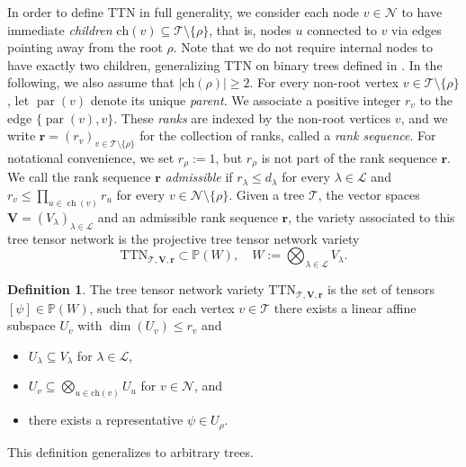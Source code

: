 \documentclass[12pt]{article}
\theoremstyle{definition}
\newtheorem{definition}[theorem]{Definition}
\numberwithin{theorem}{section}
\newcommand{\PP}{\mathbb{P}}
\begin{document}
In order to define TTN in full generality, we consider each node $v \in \mathscr N$ to have immediate \emph{children} $\mathrm{ch}(v) \subseteq \mathscr T\setminus \{\rho\}$, that is, nodes $u$ connected to $v$ via edges pointing away from the root $\rho$.  Note that we do not require internal nodes to have exactly two children,  generalizing TTN on binary trees defined in \cite{BUCZYNSKA_2015}. 
In the following, we also assume that $|\mathrm{ch}(\rho)| \geq 2$. For every non-root vertex
$v\in\mathscr T\setminus\{\rho\}$, let
$\operatorname{par}(v)$ denote its unique \emph{parent}. We associate a
positive integer $r_v$ to the edge $\{\operatorname{par}(v),v\}$.
These \emph{ranks} are indexed by the non-root vertices $v$, and we write $\mathbf r
=
(r_v)_{v\in\mathscr T\setminus\{\rho\}}$ for the collection of ranks, called a \emph{rank sequence}.
For notational convenience, we set $r_\rho:=1$,
but $r_\rho$ is not part of the rank sequence $\mathbf r$.
We call the rank sequence $\mathbf r$ \emph{admissible} if $r_\lambda\leq d_\lambda$ for every $\lambda\in\mathscr L$ and $r_v
\leq
\prod_{u\in\operatorname{ch}(v)}r_u$ for every $v\in\mathscr N\setminus\{\rho\}$.
Given a tree $\mathscr T$, the vector spaces $\mathbf{V} = (V_\lambda)_{\lambda \in \mathscr L}$ and an admissible rank sequence $\mathbf{r}$, the variety associated to this tree tensor network is the projective tree tensor network variety
\begin{equation*}
    \mathrm{TTN}_{\mathscr T, \mathbf{V}, \mathbf{r}} \subset \PP(W),\quad W:= \bigotimes_{\lambda \in \mathscr{L}} V_\lambda.
\end{equation*}
\begin{definition}\label{def:subspace_def}
    The tree tensor network variety $\mathrm{TTN}_{\mathscr T, \mathbf{V}, \mathbf{r}}$ is the set of tensors $[\psi] \in \PP(W)$, such that for each vertex $v \in \mathscr T$ there exists a linear affine subspace $U_v$ with $\dim(U_v) \leq r_v$ and
    \begin{itemize}
        \item $U_\lambda \subseteq V_\lambda$ for $\lambda \in  \mathscr L$,
        \item $U_v \subseteq \bigotimes_{u \in \mathrm{ch}(v)}U_{u}$ for $v\in \mathscr N$, and
        \item there exists a representative $\psi \in U_{\rho}$. 
    \end{itemize}
\end{definition}
This definition generalizes \cite[Definition 2.5]{BUCZYNSKA_2015} to 
arbitrary trees. 
\end{document}
